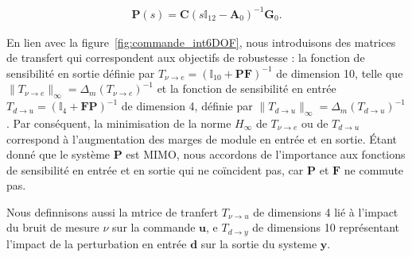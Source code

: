 \begin{align*}
    \boldsymbol{P}(s) = \boldsymbol{C} (s \mathbb{I}_{12} - \boldsymbol{A}_{0})^{-1} \boldsymbol{G}_{0}.
\end{align*} 

En lien avec la figure~\ref{fig:commande_int6DOF}, nous introduisons des matrices de transfert qui correspondent aux objectifs de robustesse : la fonction de sensibilité en sortie définie par $T_{\nu \rightarrow e}=(\mathbb{I}_{10}+\boldsymbol{P}\boldsymbol{F})^{-1}$ de dimension 10, telle que $\lVert T_{\nu \rightarrow e} \rVert _{\infty}=\Delta_m(T_{\nu \rightarrow e})^{-1} $ et la fonction de sensibilité en entrée $T_{d \rightarrow u}=(\mathbb{I}_{4}+\boldsymbol{F}\boldsymbol{P})^{-1}$ de dimension 4, définie par $\lVert T_{d \rightarrow u} \rVert _{\infty}=\Delta_m(T_{d \rightarrow u})^{-1}$.
Par conséquent, la minimisation de la norme $H_{\infty}$ de $T_{\nu \rightarrow e}$ ou de $T_{d \rightarrow u}$ correspond à l'augmentation des marges de module en entrée et en sortie. Étant donné que le système $\boldsymbol{P}$ est MIMO, nous accordons de l'importance aux fonctions de sensibilité en entrée et en sortie qui ne coïncident pas, car $\boldsymbol{P}$ et $\boldsymbol{F}$ ne commute pas.

Nous definnisons aussi la mtrice de tranfert $T_{\nu \rightarrow u}$ de dimensions 4 lié à l'impact du bruit de mesure $\nu$ sur la commande $\boldsymbol{u}$, e $T_{d \rightarrow y}$ de dimensions 10 représentant l'impact de la perturbation en entrée $\boldsymbol{d}$ sur la sortie du systeme $\boldsymbol{y}$. 

